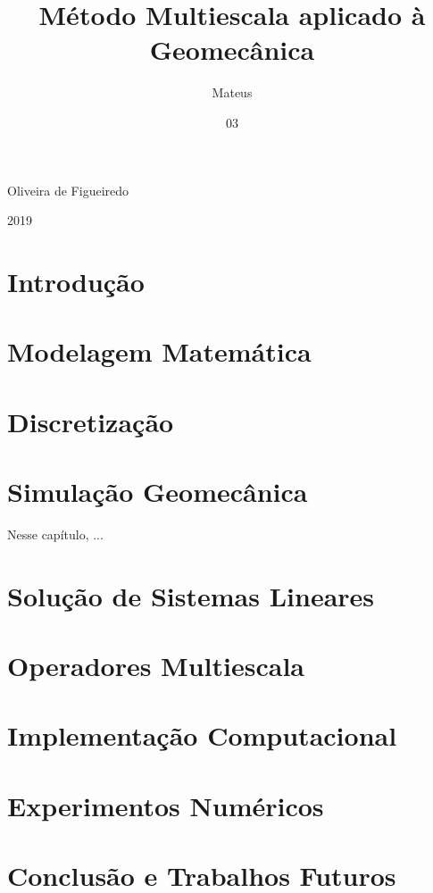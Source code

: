 \documentclass[dsc,pdftex]{coppe}
\begin{document}
  \title{Método Multiescala aplicado à Geomecânica}
  \author{Mateus}{Oliveira de Figueiredo}
  \date{03}{2019}
  \maketitle

  \frontmatter
  \tableofcontents
  \listoffigures
  \listoftables
  \printlosymbols
  \printloabbreviations

  \mainmatter

  \chapter{Introdução}

  \chapter{Modelagem Matemática} \label{ch:modelagem}
  

  \chapter{Discretização} \label{ch:discretizacao}

  \chapter{Simulação Geomecânica}

  Nesse capítulo, ...

  \chapter{Solução de Sistemas Lineares}\label{ch:sistemas}
  

  \chapter{Operadores Multiescala}\label{ch:multiescala}
  

  \chapter{Implementação Computacional}\label{ch:implementacao}

  \chapter{Experimentos Numéricos}
  

  \chapter{Conclusão e Trabalhos Futuros}

  \backmatter
  \nocite{*}
  
  
  \appendix
  
\end{document}
